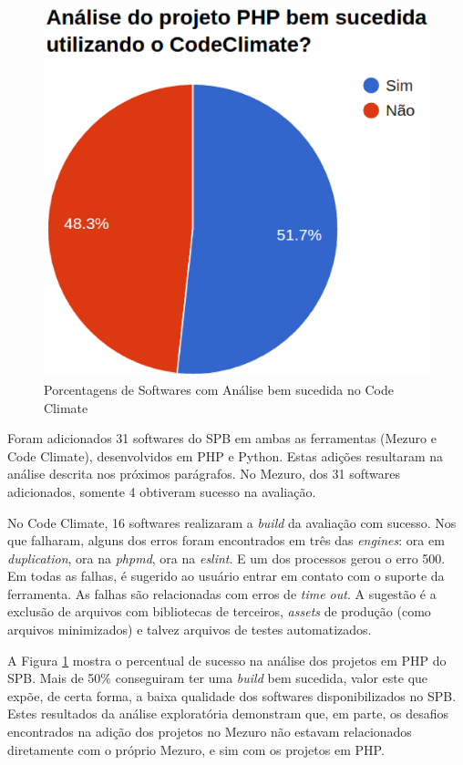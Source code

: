 \begin{figure}[!htb]
	\centering
    \includegraphics[keepaspectratio=true,scale=0.4]
    {figuras/is_codeclimate_php_success.eps}
  \caption{Porcentagens de Softwares com Análise bem sucedida no Code Climate}
  \label{fig:is_codeclimate_php_success}
\end{figure}

Foram adicionados 31 softwares do SPB em ambas as ferramentas (Mezuro e
Code Climate), desenvolvidos em PHP e Python. Estas adições resultaram na
análise descrita nos próximos parágrafos.
No Mezuro, dos 31 softwares adicionados, somente 4 obtiveram sucesso na
avaliação.

No Code Climate, 16 softwares realizaram a \textit{build} da avaliação com
sucesso. Nos que falharam, alguns dos erros foram encontrados em três das
\textit{engines}: ora em \textit{duplication}, ora na \textit{phpmd}, ora na
\textit{eslint}. E um dos processos gerou o erro 500. Em todas as falhas, é
sugerido ao usuário entrar em contato com o suporte da ferramenta. As falhas
são relacionadas com erros de \textit{time out}. A sugestão é a exclusão de
arquivos com bibliotecas de terceiros, \textit{assets} de produção (como
arquivos minimizados) e talvez arquivos de testes automatizados.

A Figura \ref{fig:is_codeclimate_php_success} mostra o percentual de sucesso na
análise dos projetos em PHP do SPB. Mais de 50\% conseguiram ter uma
\textit{build} bem sucedida, valor este que expõe, de certa forma, a baixa
qualidade dos softwares disponibilizados no SPB. Estes resultados da análise
exploratória demonstram que, em parte, os desafios encontrados na adição dos
projetos no Mezuro não estavam relacionados diretamente com o próprio Mezuro, e
sim com os projetos em PHP.

